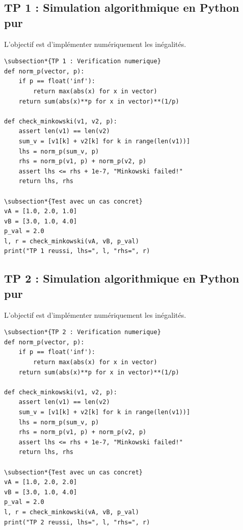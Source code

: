\documentclass[11pt,a4paper]{article}
\begin{document}
\subsection*{TP 1 : Simulation algorithmique en Python pur}

L'objectif est d'implémenter numériquement les inégalités.

\begin{lstlisting}
\subsection*{TP 1 : Verification numerique}
def norm_p(vector, p):
    if p == float('inf'):
        return max(abs(x) for x in vector)
    return sum(abs(x)**p for x in vector)**(1/p)

def check_minkowski(v1, v2, p):
    assert len(v1) == len(v2)
    sum_v = [v1[k] + v2[k] for k in range(len(v1))]
    lhs = norm_p(sum_v, p)
    rhs = norm_p(v1, p) + norm_p(v2, p)
    assert lhs <= rhs + 1e-7, "Minkowski failed!"
    return lhs, rhs

\subsection*{Test avec un cas concret}
vA = [1.0, 2.0, 1.0]
vB = [3.0, 1.0, 4.0]
p_val = 2.0
l, r = check_minkowski(vA, vB, p_val)
print("TP 1 reussi, lhs=", l, "rhs=", r)
\end{lstlisting}


\subsection*{TP 2 : Simulation algorithmique en Python pur}

L'objectif est d'implémenter numériquement les inégalités.

\begin{lstlisting}
\subsection*{TP 2 : Verification numerique}
def norm_p(vector, p):
    if p == float('inf'):
        return max(abs(x) for x in vector)
    return sum(abs(x)**p for x in vector)**(1/p)

def check_minkowski(v1, v2, p):
    assert len(v1) == len(v2)
    sum_v = [v1[k] + v2[k] for k in range(len(v1))]
    lhs = norm_p(sum_v, p)
    rhs = norm_p(v1, p) + norm_p(v2, p)
    assert lhs <= rhs + 1e-7, "Minkowski failed!"
    return lhs, rhs

\subsection*{Test avec un cas concret}
vA = [1.0, 2.0, 2.0]
vB = [3.0, 1.0, 4.0]
p_val = 2.0
l, r = check_minkowski(vA, vB, p_val)
print("TP 2 reussi, lhs=", l, "rhs=", r)
\end{lstlisting}
\end{document}
